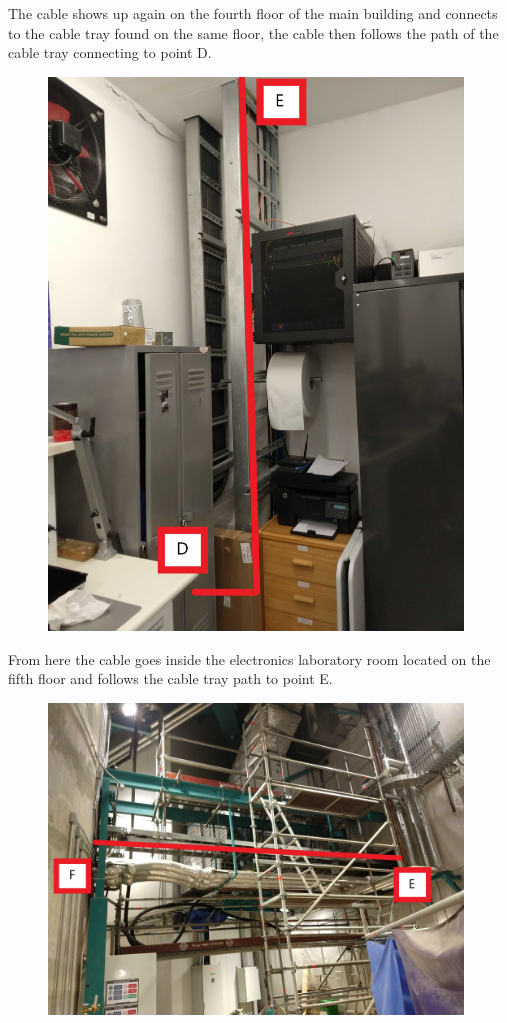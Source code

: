   The cable shows up again on the fourth floor of the main building and connects to the cable tray found on the same floor, the cable then follows the path of the cable tray connecting to point D.

\begin{figure}
  \includegraphics[width=11cm]{images/17.jpg}
  \centering
  \label{fig:jlsimon}
\end{figure}

  From here the cable goes inside the electronics laboratory room located on the fifth floor and follows the cable tray path to point E.

\begin{figure}
  \includegraphics[width=11cm]{images/18.jpg}
  \centering
  \label{fig:jlsimon}
\end{figure}

